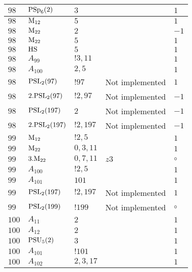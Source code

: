 \documentclass[a4paper, 11pt]{article}
\begin{document}
\begin{longtable}{lllll}
        $ 98 $ & $ {\rm PSp}_{6}(2) $ & $ 3 $ & $ ~ $ & $ 1$ \\ \hline
        $ 98 $ & $ {\rm M}_{12} $ & $ 5 $ & $ ~ $ & $ 1$ \\ \hline
        $ 98 $ & $ {\rm M}_{22} $ & $ 2 $ & $ ~ $ & $ -1$ \\ \hline
        $ 98 $ & $ {\rm M}_{22} $ & $ 5 $ & $ ~ $ & $ 1$ \\ \hline
        $ 98 $ & $ {\rm HS} $ & $ 5 $ & $ ~ $ & $ 1$ \\ \hline
        $ 98 $ & $ A_{99} $ & $ !3, 11 $ & $ ~ $ & $ 1$ \\ \hline
        $ 98 $ & $ A_{100} $ & $ 2, 5 $ & $ ~ $ & $ 1$ \\ \hline
        $ 98 $ & $ {\rm PSL}_{2}(97) $ & $ !97 $ &  Not implemented & $ 1$ \\ \hline
        $ 98 $ & $ 2.{\rm PSL}_{2}(97) $ & $ !2, 97 $ &  Not implemented & $ -1$ \\ \hline
        $ 98 $ & $ {\rm PSL}_{2}(197) $ & $ 2 $ &  Not implemented & $ -1$ \\ \hline
        $ 98 $ & $ 2.{\rm PSL}_{2}(197) $ & $ !2, 197 $ &  Not implemented & $ -1$ \\ \hline
        $ 99 $ & $ {\rm M}_{12} $ & $ ! 2,5 $ & $ ~ $ & $ 1$ \\ \hline
        $ 99 $ & $ {\rm M}_{22} $ & $ 0, 3, 11 $ & $ ~ $ & $ 1$ \\ \hline
        $ 99 $ & $ 3.{\rm M}_{22} $ & $ 0,7,11 $ & $ z3 $ &  $\circ$ \\ \hline
        $ 99 $ & $ A_{100} $ & $ !2, 5 $ & $ ~ $ & $ 1$ \\ \hline
        $ 99 $ & $ A_{101} $ & $ 101 $ & $ ~ $ & $ 1$ \\ \hline
        $ 99 $ & $ {\rm PSL}_{2}(197) $ & $ !2, 197 $ &  Not implemented & $ 1$ \\ \hline
        $ 99 $ & $ {\rm PSL}_{2}(199) $ & $ !199 $ &  Not implemented &  $\circ$ \\ \hline
        $ 100 $ & $ A_{11} $ & $ 2 $ & $ ~ $ & $ 1$ \\ \hline
        $ 100 $ & $ A_{12} $ & $ 2 $ & $ ~ $ & $ 1$ \\ \hline
        $ 100 $ & $ {\rm PSU}_{5}(2) $ & $ 3 $ & $ ~ $ & $ 1$ \\ \hline
        $ 100 $ & $ A_{101} $ & $ !101 $ & $ ~ $ & $ 1$ \\ \hline
        $ 100 $ & $ A_{102} $ & $ 2, 3, 17 $ & $ ~ $ & $ 1$ \\ \hline

\end{longtable}
\end{document}

